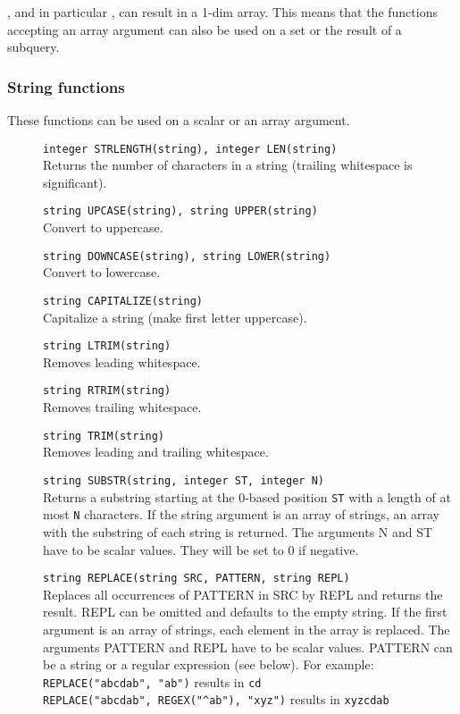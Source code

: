 , and in particular
, can result in a 1-dim array.
This means that the functions accepting an array argument can also
be used on a set or the result of a subquery.

\subsubsection{String functions}
These functions can be used on a scalar or an array argument.
\begin{description}
  \item[] \texttt{integer STRLENGTH(string),  integer LEN(string)}\\
    Returns the number of characters in a string
    (trailing whitespace is significant).
  \item[] \texttt{string UPCASE(string), string UPPER(string) }\\
    Convert to uppercase.
  \item[] \texttt{string DOWNCASE(string),  string LOWER(string)}\\
    Convert to lowercase.
  \item[] \texttt{string CAPITALIZE(string)}\\
    Capitalize a string (make first letter uppercase).
  \item[] \texttt{string LTRIM(string)}\\
    Removes leading whitespace.
  \item[] \texttt{string RTRIM(string)}\\
    Removes trailing whitespace.
  \item[] \texttt{string TRIM(string)}\\
    Removes leading and trailing whitespace.
  \item[] \texttt{string SUBSTR(string, integer ST, integer N)}\\
    Returns a substring starting at the 0-based position
    \texttt{ST} with a length of at most \texttt{N} characters.
   If the string argument is an array of strings, an array with the substring of each
   string is returned. The arguments N and ST have to be scalar
   values. They will be set to 0 if negative.
  \item[] \texttt{string REPLACE(string SRC, PATTERN, string REPL)}\\
   Replaces all occurrences of PATTERN in SRC by REPL and returns the
   result. REPL can be omitted and defaults to the empty string.
   If the first argument is an array of strings, each element in the
   array is replaced.
   The arguments PATTERN and REPL have to be scalar values. PATTERN
   can be a string or a regular expression (see below). For example:
   \\\verb+REPLACE("abcdab", "ab")+ results in \texttt{cd}
   \\\verb+REPLACE("abcdab", REGEX("^ab"), "xyz")+ results in \texttt{xyzcdab}
\end{description}

